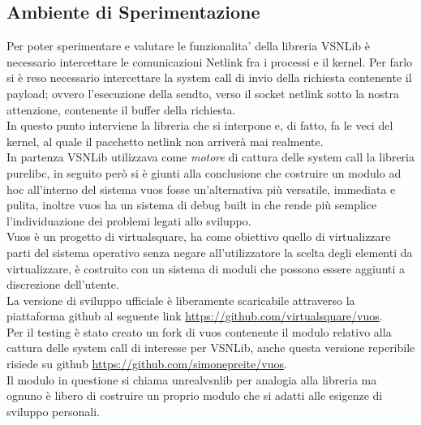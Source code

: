 \subsection{Ambiente di Sperimentazione}
Per poter sperimentare e valutare le funzionalita' della libreria VSNLib \`e necessario intercettare le comunicazioni Netlink fra i processi e il kernel.
Per farlo si \`e reso necessario intercettare la system call di invio della richiesta contenente il payload; ovvero l'esecuzione della sendto, verso il socket netlink sotto la nostra attenzione, contenente il buffer della richiesta.\\
In questo punto interviene la libreria che si interpone e, di fatto, fa le veci del kernel, al quale il pacchetto netlink non arriver\`a mai realmente.\\
In partenza VSNLib utilizzava come \textit{motore} di cattura delle system call la libreria purelibc\cite{K8}, in seguito per\`o si \`e giunti alla conclusione che costruire un modulo ad hoc all'interno del sistema vuos fosse un'alternativa pi\`u versatile, immediata e pulita, inoltre vuos ha un sistema di debug built in che rende pi\`u semplice l'individuazione dei problemi legati allo sviluppo.\\
Vuos\cite{K5} \`e un progetto di virtualsquare, ha come obiettivo quello di virtualizzare parti del sistema operativo senza negare all'utilizzatore la scelta degli elementi da virtualizzare, \`e costruito con un sistema di moduli che possono essere aggiunti a discrezione dell'utente.\\
La versione di sviluppo ufficiale \`e liberamente scaricabile attraverso la piattaforma github al seguente link \url{https://github.com/virtualsquare/vuos}. \\
Per il testing \`e stato creato un fork di vuos contenente il modulo relativo alla cattura delle system call di interesse per VSNLib, anche questa versione reperibile risiede su github \url{https://github.com/simonepreite/vuos}.\\
Il modulo in questione si chiama unrealvsnlib per analogia alla libreria ma ognuno \`e libero di costruire un proprio modulo che si adatti alle esigenze di sviluppo personali.\\

